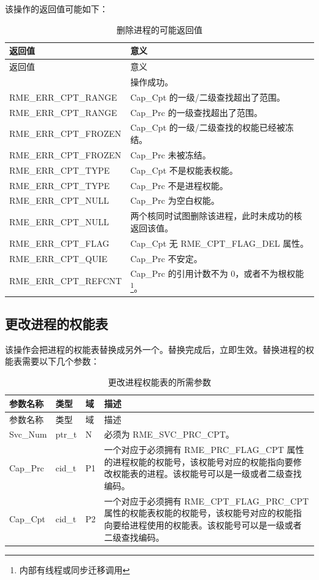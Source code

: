 该操作的返回值可能如下：

\begin{xltabular}{\textwidth}{@{}>{\hsize\raggedright\arraybackslash}X>{\hsize\raggedright\arraybackslash}X@{}}
\caption{删除进程的可能返回值}\label{tab:4-13-delete-process-return-values}\\
\toprule
返回值 & 意义\tabularnewline
\endfirsthead
\toprule
返回值 & 意义\tabularnewline
\midrule
\endhead
\bottomrule
{} & 操作成功。\tabularnewline
    RME\_ERR\_CPT\_RANGE & Cap\_Cpt 的一级/二级查找超出了范围。\tabularnewline
    RME\_ERR\_CPT\_RANGE & Cap\_Prc 的一级查找超出了范围。\tabularnewline
    RME\_ERR\_CPT\_FROZEN & Cap\_Cpt 的一级/二级查找的权能已经被冻结。\tabularnewline
    RME\_ERR\_CPT\_FROZEN & Cap\_Prc 未被冻结。\tabularnewline
    RME\_ERR\_CPT\_TYPE & Cap\_Cpt 不是权能表权能。\tabularnewline
    RME\_ERR\_CPT\_TYPE & Cap\_Prc 不是进程权能。\tabularnewline
    RME\_ERR\_CPT\_NULL & Cap\_Prc 为空白权能。\tabularnewline
    RME\_ERR\_CPT\_NULL & 两个核同时试图删除该进程，此时未成功的核返回该值。\tabularnewline
    RME\_ERR\_CPT\_FLAG & Cap\_Cpt 无 RME\_CPT\_FLAG\_DEL 属性。\tabularnewline
    RME\_ERR\_CPT\_QUIE & Cap\_Prc 不安定。\tabularnewline
    RME\_ERR\_CPT\_REFCNT & Cap\_Prc 的引用计数不为 0，或者不为根权能\footnote{内部有线程或同步迁移调用}。\tabularnewline
\end{xltabular}

\subsection{更改进程的权能表}\label{subsec:4-change-process-capability-table}
\nopagebreak[4]

该操作会把进程的权能表替换成另外一个。替换完成后，立即生效。替换进程的权能表需要以下几个参数：

\begin{xltabular}{\textwidth}{@{}>{\hsize\raggedright\arraybackslash}X>{\hsize\raggedright\arraybackslash}X>{\hsize\raggedright\arraybackslash}X>{\hsize\raggedright\arraybackslash}X@{}}
\caption{更改进程权能表的所需参数}\label{tab:4-14-change-process-capability-table-parameters}\\
\toprule
参数名称 & 类型 & 域 & 描述\tabularnewline
\endfirsthead
\toprule
参数名称 & 类型 & 域 & 描述\tabularnewline
\midrule
\endhead
\bottomrule
\endlastfoot
Svc\_Num & ptr\_t & N & 必须为 RME\_SVC\_PRC\_CPT。\tabularnewline
Cap\_Prc & cid\_t & P1 &
一个对应于必须拥有 RME\_PRC\_FLAG\_CPT 属性的进程权能的权能号，该权能号对应的权能指向要修改权能表的进程。该权能号可以是一级或者二级查找编码。\tabularnewline
Cap\_Cpt & cid\_t & P2 &
一个对应于必须拥有 RME\_CPT\_FLAG\_PRC\_CPT 属性的权能表权能的权能号，该权能号对应的权能指向要给进程使用的权能表。该权能号可以是一级或者二级查找编码。\tabularnewline
\end{xltabular}

